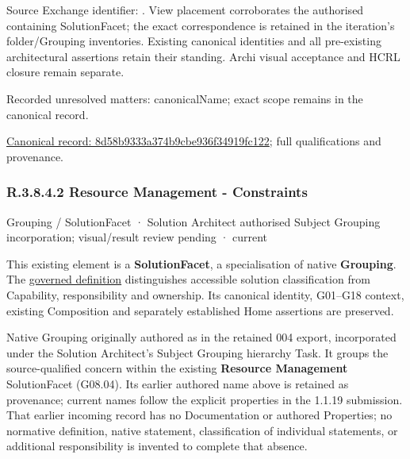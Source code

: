 Source Exchange identifier: \texttt{}. View placement corroborates
the authorised containing SolutionFacet; the exact correspondence is retained in the
iteration's folder/Grouping inventories. Existing canonical identities and all
pre-existing architectural assertions retain their standing. Archi visual
acceptance and HCRL closure remain separate.


{\small Recorded unresolved matters: canonicalName; exact scope remains in the canonical record.}\par
{\footnotesize \href{../../../../../../../continuum/grouping/8d58b9333a374b9cbe936f34919fc122.md}{Canonical record: 8d58b9333a374b9cbe936f34919fc122}; full qualifications and provenance.}\par
\subsubsection*{R.3.8.4.2 Resource Management - Constraints}
\label{navigation:R.3.8.4.2}

\label{element:d903a1d46d6e4a3c84d247789e43aa41}
{\small Grouping / SolutionFacet · Solution Architect authorised Subject Grouping incorporation; visual/result review pending · current}\par

This existing element is a \textbf{SolutionFacet}, a specialisation of native
\textbf{Grouping}. The \href{\detokenize{../../../../../../../governance/continuum-representation.md#solutionfacet-classification--1119-candidate}}{governed definition}
distinguishes accessible solution classification from Capability, responsibility
and ownership. Its canonical identity, G01–G18 context, existing Composition
and separately established Home assertions are preserved.



Native Grouping originally authored as \texttt{} in the retained 004 export,
incorporated under the Solution Architect's Subject Grouping hierarchy Task.
It groups the source-qualified \texttt{} concern within
the existing \textbf{Resource Management} SolutionFacet (G08.04). Its earlier authored name above is retained as provenance; current names
follow the explicit properties in the 1.1.19 submission.
That earlier incoming record has no Documentation or authored Properties; no normative
definition, native statement, classification of individual statements, or
additional responsibility is invented to complete that absence.



